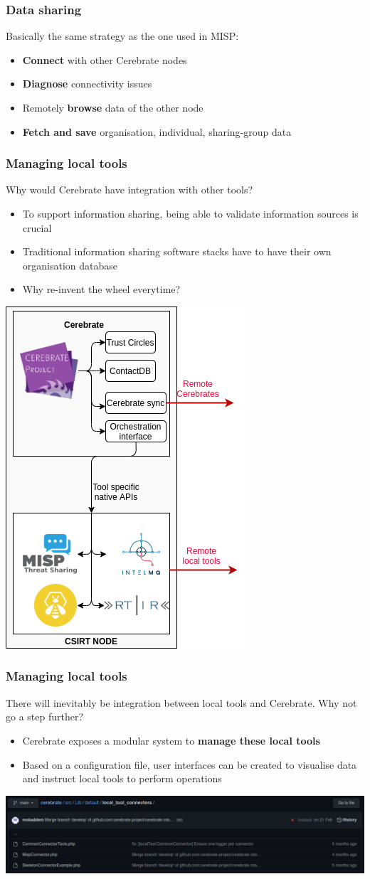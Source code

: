 \begin{frame}
\frametitle{Data sharing}
Basically the same strategy as the one used in MISP:
    \begin{itemize}
        \item \textbf{Connect} with other Cerebrate nodes
        \item \textbf{Diagnose} connectivity issues
        \item Remotely \textbf{browse} data of the other node
        \item \textbf{Fetch and save} organisation, individual, sharing-group data
    \end{itemize}
\end{frame}

\begin{frame}
\frametitle{Managing local tools}
Why would Cerebrate have integration with other tools?
    \begin{itemize}
        \item To support information sharing, being able to validate information sources is crucial
        \item Traditional information sharing software stacks have to have their own organisation database
        \item Why re-invent the wheel everytime?
    \end{itemize}
    \begin{center}
        \includegraphics[width=0.2\linewidth]{pictures/software-stack.png}
    \end{center}
\end{frame}

\begin{frame}
\frametitle{Managing local tools}
There will inevitably be integration between local tools and Cerebrate. Why not go a step further?
    \begin{itemize}
        \item Cerebrate exposes a modular system to {\bf manage these local tools}
        \item Based on a configuration file, user interfaces can be created to visualise data and instruct local tools to perform operations
    \end{itemize}
    \begin{center}
        \includegraphics[width=1.0\linewidth]{pictures/github-local-tool.png}
    \end{center}
\end{frame}

